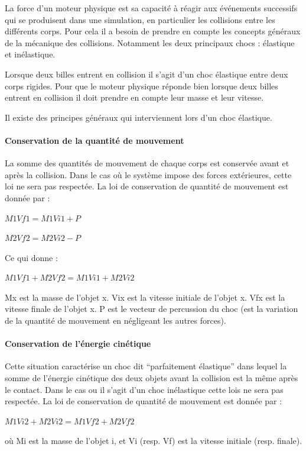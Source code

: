 \documentclass{report}
\begin{document}
La force d’un moteur physique est sa capacité à réagir aux événements successifs qui se produisent dans une simulation, en particulier les collisions entre les différents corps.
Pour cela il a besoin de prendre en compte les concepts généraux de la mécanique des collisions. Notamment les deux principaux chocs : élastique et inélastique.

Lorsque deux billes entrent en collision il s’agit d’un choc élastique entre deux corps rigides. Pour que le moteur physique réponde bien lorsque deux billes entrent en collision il doit prendre en compte leur masse et leur vitesse.

Il existe des principes généraux qui interviennent lors d’un choc élastique.

\paragraph*{Conservation de la quantité de mouvement}

La somme des quantités de mouvement de chaque corps est conservée avant et après la collision. Dans le cas où le système impose des forces extérieures, cette loi ne sera pas respectée.
La loi de conservation de quantité de mouvement est donnée par :

\(M1Vf1 = M1Vi1 + P\)

\(M2Vf2 = M2Vi2 - P\)

Ce qui donne :

\(M1Vf1 + M2Vf2 = M1Vi1+M2Vi2\)

Mx est la masse de l’objet x.
Vix est la vitesse initiale de l’objet x.
Vfx est la vitesse finale de l’objet x.
P est le vecteur de percussion du choc (est la variation de la quantité de mouvement en négligeant les autres forces).

\paragraph*{Conservation de l'énergie cinétique}

Cette situation caractérise un choc dit “parfaitement élastique” dans lequel la somme de l’énergie cinétique des deux objets avant la collision est la même après le contact. Dans le cas ou il s’agit d’un choc inélastique cette lois ne sera pas respectée. 
La loi de conservation de quantité de mouvement est donnée par :

\(M1Vi2 + M2Vi2 = M1Vf2 + M2Vf2\)

où Mi est la masse de l’objet i, et Vi (resp. Vf) est la vitesse initiale (resp. finale).
\end{document}
